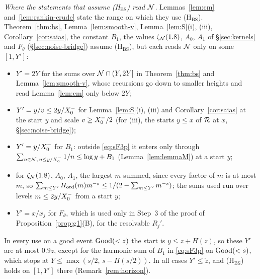 \emph{Where the statements that assume \textup{(H$_{\mathrm{BS}}$)} read $\mathcal{N}$.} Lemmas~\ref{lem:cm} and~\ref{lem:rankin-crude} state
the range on which they use \textup{(H$_{\mathrm{BS}}$)}. Theorem~\ref{thm:bs}, Lemma~\ref{lem:smooth-v},
Lemma~\ref{lem:S}(i), (iii), Corollary~\ref{cor:saias}, the constant $B_1$, the values $\zeta_{\mathcal{N}}(1.8)$, $A_0$, $A_1$ of
\S\ref{sec:kernels} and $F_\theta$ (\S\ref{sec:noise-bridge}) assume \textup{(H$_{\mathrm{BS}}$)}, but each reads $\mathcal{N}$ only on some
$[1,Y']$:
\begin{itemize}
\item $Y'=2Y$ for the sums over $\mathcal{N}\cap(Y,2Y]$ in Theorem~\ref{thm:bs} and Lemma~\ref{lem:smooth-v}, whose recursions go down to
  smaller heights and read Lemma~\ref{lem:cm} only below $2Y$;
\item $Y'=y/v\le2y/X_0^{-}$ for Lemma~\ref{lem:S}(i), (iii) and Corollary~\ref{cor:saias} at the start $y$ and scale $v\ge X_0^{-}/2$
  (for (iii), the starts $y\le x$ of $\mathcal{R}$ at $x$, \S\ref{sec:noise-bridge});
\item $Y'=y/X_0^{-}$ for $B_1$: outside \ref{eq:sF3p} it enters only through $\sum_{n\in\mathcal{N},\,n\le y/X_0^{-}}1/n\le\log y+B_1$
  (Lemma~\ref{lem:lemmaM}) at a start $y$;
\item for $\zeta_{\mathcal{N}}(1.8)$, $A_0$, $A_1$, the largest $m$ summed, since every factor of $m$ is at most $m$, so
  $\sum_{m\le Y'}H_{\mathrm{ord}}(m)m^{-s}\le1/(2-\sum_{m\le Y'}m^{-s})$; the sums used run over levels $m\le2y/X_0^{-}$ from a start $y$;
\item $Y'=x/x_j$ for $F_\theta$, which is used only in Step~3 of the proof of Proposition~\ref{prop:g1}(B), for the resolvable $R_j'$.
\end{itemize}
In every use on a good event $\mathrm{Good}(<z)$ the start is $y\le z+H(z)$, so these $Y'$ are at most $0.9z$, except for the harmonic sum
of $B_1$ in \ref{eq:sF3p} on $\mathrm{Good}(<s)$, which stops at $Y\le\max(s/2,\,s-H(s/2))$. In all cases $Y'\le\check z$, and
\textup{(H$_{\mathrm{BS}}$)} holds on $[1,Y']$ there (Remark~\ref{rem:horizon}).

